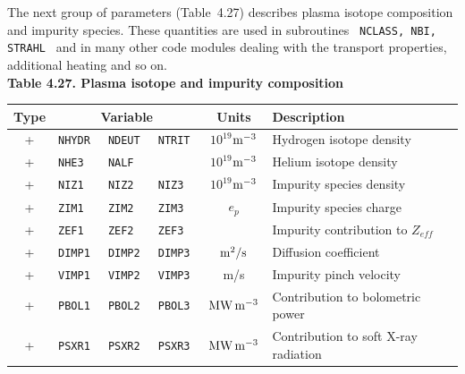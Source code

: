 The next group of parameters (Table~4.27) describes plasma isotope
composition and impurity species. 
These quantities are used in subroutines 
{\tt ~NCLASS, NBI, STRAHL~} and in many other code modules
dealing with the transport properties, additional heating and so on.
\\
\indent
{\bf Table 4.27. Plasma isotope and impurity composition}\bigskip\\
\begin{tabular}{|c|lll|c|l|}
\hline
\hspace*{-1pt}\bf Type\hspace*{-1pt} &\multicolumn{3}{|c|}{\bf Variable} 
		&\bf Units &\bf Description		\\	\hline
+ &\tt NHYDR &\tt NDEUT &\tt NTRIT 	
	& $10^{19}$${\rm m}^{-3}$	& Hydrogen isotope density\\
+ &\tt NHE3  &\tt NALF  &  	
	&$10^{19}$${\rm m}^{-3}$ & Helium isotope density\\
+ &\tt NIZ1  &\tt NIZ2  &\tt NIZ3 
	& $10^{19}$${\rm m}^{-3}$ 	& Impurity species density\\
+ &\tt ZIM1  &\tt ZIM2  &\tt ZIM3 
	& $e_p$ 		& Impurity species charge \\ 
+ &\tt ZEF1  &\tt ZEF2  &\tt ZEF3
	& 			& Impurity contribution to $Z_{eff}$\\
+ &\tt DIMP1 &\tt DIMP2 &\tt DIMP3
	& ${\rm m}^2/{\rm s}$ 	& Diffusion coefficient \\
+ &\tt VIMP1 &\tt VIMP2 &\tt VIMP3
	& m/s 			& Impurity pinch velocity \\
+ &\tt PBOL1 &\tt PBOL2 &\tt PBOL3
	& ${\rm MW}\,{\rm m}^{-3}$	& Contribution to bolometric power \\
+ &\tt PSXR1 &\tt PSXR2 &\tt PSXR3
	& ${\rm MW}\,{\rm m}^{-3}$ 	& Contribution to soft X-ray radiation \\
\hline
\end{tabular}\bigskip

